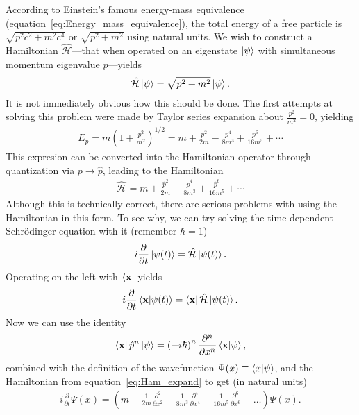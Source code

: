 \documentclass[titlepage,letterpaper,onecolumn,11pt,final]{report}
\newcommand{\Pm}{\hat{p}}
\newcommand{\Ham}{\hat{\mathcal{H}}}
\newcommand{\ketb}[1]{\ket{\mathbf{#1}}}
\newcommand{\brab}[1]{\bra{\mathbf{#1}}}
\numberwithin{equation}{section}
\numberwithin{figure}{section}
\begin{document}
According to Einstein's famous energy-mass equivalence (equation~\ref{eq:Energy_mass_equivalence}), the total energy of a free particle is $\sqrt{p^{2} c^{2} + m^{2} c^{4}}$ or $\sqrt{p^{2} + m^{2}}$ using natural units. We wish to construct a Hamiltonian $\Ham$---that when operated on an eigenstate $\ket{\psi}$ with simultaneous momentum eigenvalue $p$---yields
\begin{gather}
	\label{eq:Naive_Ham}
	\Ham \ket{\psi} = \sqrt{p^{2} + m^{2}} \ket{\psi} .
\end{gather}
%
It is not immediately obvious how this should be done. The first attempts at solving this problem were made by Taylor series expansion about $\frac{p^{2}}{m^{2}} = 0$, yielding
\begin{gather}
	\label{eq:E_expand}
	E_{p} = m \left( 1 + \frac{p^{2}}{m^{2}} \right)^{1/2} = m + \frac{p^{2}}{2 m} - \frac{p^{4}}{8 m^{3}} + \frac{p^{6}}{16 m^{5}} + \cdots 
\end{gather}
%
This expresion can be converted into the Hamiltonian operator through quantization via $p \rightarrow \Pm$, leading to the Hamiltonian
\begin{gather}
	\label{eq:Ham_expand}
	\Ham = m + \frac{\Pm^{2}}{2 m} - \frac{\Pm^{4}}{8 m^{3}} + \frac{\Pm^{6}}{16 m^{5}} + \cdots 
\end{gather}
%
Although this is technically correct, there are serious problems with using the Hamiltonian in this form. To see why, we can try solving the time-dependent Schr\"{o}dinger equation with it (remember $\hbar = 1$)
\begin{gather}
	\label{eq:TDSE}
	i \frac{\partial}{\partial t} \ket{\psi (t)} = \Ham \ket{\psi (t)} .
\end{gather}
%
Operating on the left with $\bra{\bf{x}}$ yields
\begin{gather}
	\label{eq:KG_precursor}
	i \frac{\partial}{\partial t} \braket{\mathbf{x} | \psi (t)} = \bra{\mathbf{x}} \Ham \ket{\psi (t)} .
\end{gather}
%
Now we can use the identity
\begin{gather}
	\label{eq:xpa_identity}
	\brab{x} \Pm^{n} \ketb{\psi} = \left( - i \hbar \right)^{n} \frac{\partial^{n}}{\partial x^{n}} \braket{\mathbf{x} | \mathbf{\psi} },
\end{gather}
%
combined with the definition of the wavefunction $\Psi (x) \equiv \braket{x | \psi}$, and the Hamiltonian from equation~\ref{eq:Ham_expand} to get (in natural units)
%
\begin{gather}
	\label{eq:failed_wave}
	i \frac{\partial}{\partial t} \Psi (x) = \left( m - \frac{1}{2 m} \frac{\partial^{2}}{\partial x^{2}} - \frac{1}{8 m^{3}} \frac{\partial^{4}}{\partial x^{4}} - \frac{1}{16 m^{5}} \frac{\partial^{6}}{\partial x^{6}} - \ldots \right) \Psi (x) .
\end{gather}
\end{document}
